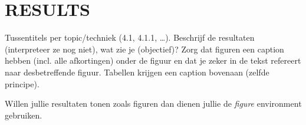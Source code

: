 \section{RESULTS}
Tussentitels per topic/techniek (4.1, 4.1.1, \dots).
Beschrijf de resultaten (interpreteer ze nog niet), wat zie je (objectief)?
Zorg dat figuren een caption hebben (incl. alle afkortingen) onder de figuur en dat je zeker in de tekst refereert naar desbetreffende figuur. 
Tabellen krijgen een caption bovenaan (zelfde principe).

Willen jullie resultaten tonen zoals figuren dan dienen jullie de \textit{figure} environment gebruiken.
